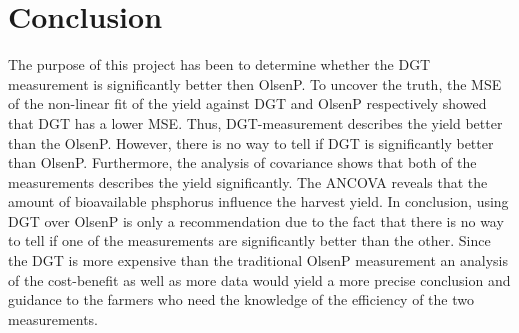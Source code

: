 \documentclass[11pt, fleqn, titlepage]{article}
\begin{document}
\section{Conclusion}

The purpose of this project has been to determine whether the DGT measurement is significantly better then OlsenP. To uncover the truth, the MSE of the non-linear fit of the yield against DGT and OlsenP respectively showed that DGT has a lower MSE. Thus, DGT-measurement describes the yield better than the OlsenP. However, there is no way to tell if DGT is significantly better than OlsenP. Furthermore, the analysis of covariance shows that both of the measurements describes the yield significantly. The ANCOVA reveals that the amount of bioavailable phsphorus influence the harvest yield. In conclusion, using DGT over OlsenP is only a recommendation due to the fact that there is no way to tell if one of the measurements are significantly better than the other. Since the DGT is more expensive than the traditional OlsenP measurement an analysis of the cost-benefit as well as more data would yield a more precise conclusion and guidance to the farmers who need the knowledge of the efficiency of the two measurements.



\end{document}

